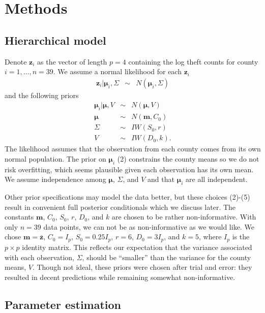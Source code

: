 \documentclass{asaproc}
\newcommand{\m}[1]{\mathbf{\bm{#1}}}
\begin{document}
\section{Methods}

\subsection{Hierarchical model}

Denote $\m{z}_i$ as the vector of length $p=4$ containing the log theft counts for county $i=1,\ldots,n=39$. We assume a normal likelihood for each $\m{z}_i$
\begin{eqnarray}
\m{z}_i|\m{\mu}_i,\Sigma &\sim& N(\m{\mu}_i, \Sigma)
\end{eqnarray}
and the following priors
\begin{eqnarray}
\m{\mu}_i|\m{\mu},V &\sim& N(\m{\mu}, V) \\
\m{\mu} &\sim& N(\m{m}, C_0) \\
\Sigma &\sim& IW(S_0, r) \\
V &\sim& IW(D_0, k).
\end{eqnarray}
The likelihood assumes that the observation from each county comes from its own normal population. The prior on $\m{\mu}_i$ (2) constrains the county means so we do not risk overfitting, which seems plausible given each observation has its own mean. We assume independence among $\m{\mu}$, $\Sigma$, and $V$ and that $\m{\mu}_i$ are all independent.

Other prior specifications may model the data better, but these choices (2)-(5) result in convenient full posterior conditionals which we discuss later. The constants $\m{m}$, $C_0$, $S_0$, $r$, $D_0$, and $k$ are chosen to be rather non-informative. With only $n=39$ data points, we can not be as non-informative as we would like. We chose $\m{m}=\bar{\m{z}}$, $C_0=I_p$, $S_0=0.25 I_p$, $r=6$, $D_0=3 I_p$, and $k=5$, where $I_p$ is the $p\times p$ identity matrix. This reflects our expectation that the variance associated with each observation, $\Sigma$, should be ``smaller'' than the variance for the county means, $V$. Though not ideal, these priors were chosen after trial and error: they resulted in decent predictions while remaining somewhat non-informative.

\subsection{Parameter estimation}
\end{document}
